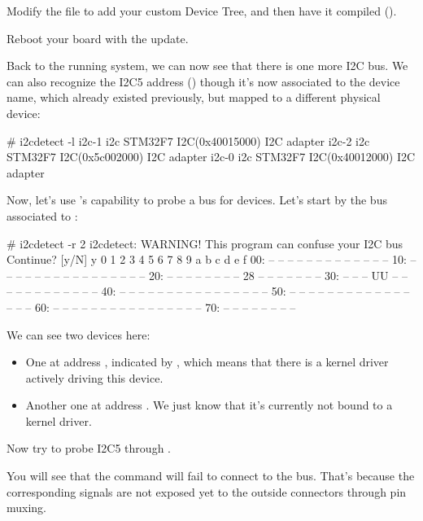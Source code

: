 {Modify the  file to add your custom
Device Tree, and then have it compiled ().

Reboot your board with the update.

Back to the running system, we can now see that there is one more
I2C bus. We can also recognize the I2C5 address ()
though it's now associated to the  device name, which
already existed previously, but mapped to a different physical device:

\begin{bashinput}
# i2cdetect -l
i2c-1	i2c             STM32F7 I2C(0x40015000)                 I2C adapter
i2c-2	i2c             STM32F7 I2C(0x5c002000)                 I2C adapter
i2c-0	i2c             STM32F7 I2C(0x40012000)                 I2C adapter
\end{bashinput}

Now, let's use 's capability to probe a bus for devices.
Let's start by the bus associated to :

\begin{bashinput}
# i2cdetect -r 2
i2cdetect: WARNING! This program can confuse your I2C bus
Continue? [y/N] y
     0  1  2  3  4  5  6  7  8  9  a  b  c  d  e  f
00:          -- -- -- -- -- -- -- -- -- -- -- -- --
10: -- -- -- -- -- -- -- -- -- -- -- -- -- -- -- --
20: -- -- -- -- -- -- -- -- 28 -- -- -- -- -- -- --
30: -- -- -- UU -- -- -- -- -- -- -- -- -- -- -- --
40: -- -- -- -- -- -- -- -- -- -- -- -- -- -- -- --
50: -- -- -- -- -- -- -- -- -- -- -- -- -- -- -- --
60: -- -- -- -- -- -- -- -- -- -- -- -- -- -- -- --
70: -- -- -- -- -- -- -- --
\end{bashinput}

We can see two devices here:
\begin{itemize}
\item One at address , indicated by ,
      which means that there is a kernel driver actively
      driving this device.
\item Another one at address . We just know that
      it's currently not bound to a kernel driver.
\end{itemize}

Now try to probe I2C5 through .

You will see that the command will fail to connect to
the bus. That's because the corresponding signals are
not exposed yet to the outside connectors through pin muxing.

}
